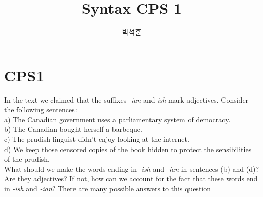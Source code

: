 \documentclass[12pt, a4paper]{book}
\begin{document}
\title{Syntax CPS 1}
\author{박석훈}
\maketitle

\section{CPS1}
In the text we claimed that the suffixes \textit{-ian} and \textit{ish} mark adjectives. Consider the following sentences: \\

a) The Canadian government uses a parliamentary system of democracy. \\
b) The Canadian bought herself a barbeque. \\
c) The prudish linguist didn't enjoy looking at the internet. \\
d) We keep those censored copies of the book hidden to protect the sensibilities of the prudish. \\

What should we make the words ending in \textit{-ish} and \textit{-ian} in sentences (b) and (d)? Are they adjectives? If not, how can we account for the fact that these words end in \textit{-ish} and \textit{-ian}? There are many possible answers to this question
\end{document}
